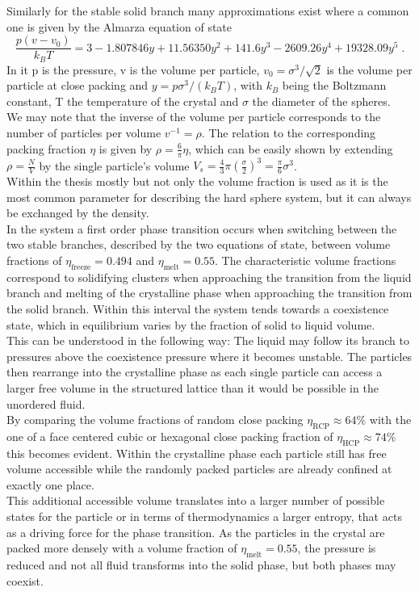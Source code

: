 Similarly for the stable solid branch many approximations exist where a common one is given by the Almarza equation of state\cite{Almarza2009}
\begin{equation}
\frac{p(v-v_0)}{k_B T} = 3 - 1.807846 y + 11.56350 y^2 + 141.6 y^3 - 2609.26 y^4 + 19328.09 y^5 \; \text{.}
\end{equation}
In it p is the pressure, v is the volume per particle, $v_0=\sigma^3/\sqrt{2}$ is the volume per particle at close packing and $y=p \sigma^3 / (k_B T)$, with $k_B$ being the Boltzmann constant, T the temperature of the crystal and $\sigma$ the diameter of the spheres.\\
We may note that the inverse of the volume per particle corresponds to the number of particles per volume $ v^{-1} = \rho$. The relation to the corresponding packing fraction $\eta$ is given by $\rho = \frac{6}{ \pi} \eta$, which can be easily shown by extending $\rho = \frac{N}{V}$ by the single particle's volume $V_s = \frac{4}{3} \pi \left(\frac{\sigma}{2}\right)^3 = \frac{\pi}{6} \sigma^3$.\\
Within the thesis mostly but not only the volume fraction is used as it is the most common parameter for describing the hard sphere system, but it can always be exchanged by the density.\\ 

In the system a first order phase transition occurs when switching between the two stable branches, described by the two equations of state, between volume fractions of $\eta_{\text{freeze}} = 0.494$ and $\eta_{\text{melt}}=0.55$. The characteristic volume fractions correspond to solidifying clusters when approaching the transition from the liquid branch and melting of the crystalline phase when approaching the transition from the solid branch. Within this interval the system tends towards a coexistence state, which in equilibrium varies by the fraction of solid to liquid volume.\\
This can be understood in the following way: The liquid may follow its branch to pressures above the coexistence pressure where it becomes unstable. The particles then rearrange into the crystalline phase as each single particle can access a larger free volume in the structured lattice than it would be possible in the unordered fluid.\\
By comparing the volume fractions of random close packing $\eta_{\text{RCP}}\approx 64\%$ with the one of a face centered cubic or hexagonal close packing fraction of $\eta_{\text{HCP}} \approx 74 \%$ this becomes evident. Within the crystalline phase each particle still has free volume accessible while the randomly packed particles are already confined at exactly one place.\\
This additional accessible volume translates into a larger number of possible states for the particle or in terms of thermodynamics a larger entropy, that acts as a driving force for the phase transition. As the particles in the crystal are packed more densely with a volume fraction of $\eta_{\text{melt}}=0.55$, the pressure is reduced and not all fluid transforms into the solid phase, but both phases may coexist.\\

